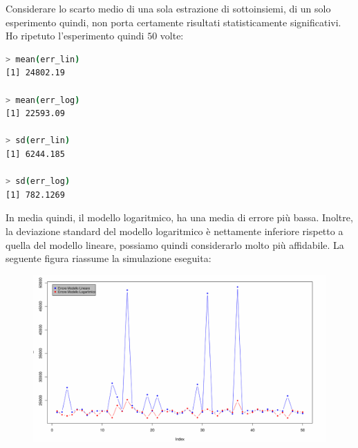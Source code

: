 \documentclass[11pt,a4paper]{article}
\begin{document}
Considerare lo scarto medio di una sola estrazione di sottoinsiemi, di un solo
esperimento quindi, non porta certamente risultati statisticamente
significativi. Ho ripetuto l'esperimento quindi $50$ volte:
\begin{lstlisting}[language=bash,basicstyle=\tiny,tabsize=2,frame = single]
> mean(err_lin)
[1] 24802.19

> mean(err_log)
[1] 22593.09

> sd(err_lin)
[1] 6244.185

> sd(err_log)
[1] 782.1269
\end{lstlisting}
In media quindi, il modello logaritmico, ha una media di errore pi\`u bassa.
Inoltre, la deviazione standard del modello logaritmico \`e nettamente
inferiore rispetto a quella del modello
\clearpage
\vspace*{-1.5cm}
\noindent
lineare, possiamo quindi considerarlo molto pi\`u affidabile. La seguente figura
riassume la simulazione eseguita:
\begin{figure}[H]
	\begin{center}
		\vspace{-0.4cm}
		\hspace*{-2.7cm}
		\includegraphics[scale=0.65]{imgs/simulation.pdf}
		\vspace{-1.5cm}
	\end{center}
\end{figure}
\end{document}
